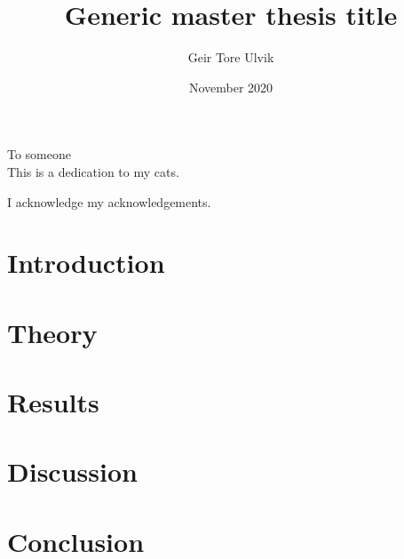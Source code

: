 \documentclass[twoside,english]{uiofysmaster}
\author{Geir Tore Ulvik}
\title{Generic master thesis title}
\date{November 2020}
\begin{document}
\maketitle

\begin{abstract}

\end{abstract}

\begin{dedication}
  To someone
  \\\vspace{12pt}
  This is a dedication to my cats.
\end{dedication}

\begin{acknowledgements}
  I acknowledge my acknowledgements.
\end{acknowledgements}

\tableofcontents

\chapter{Introduction}

\chapter{Theory}

\chapter{Results}

\chapter{Discussion}

\chapter{Conclusion}




\end{document}
